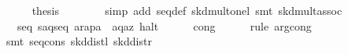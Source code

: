 \begin{isabellebody}
\ \ \ \ \isamarkupfalse%
\ {}thesis\isanewline
\ \ \ \ \ \ \isamarkupfalse%
\ {}simp\ add{}\ seq{}def\ skd{}mult{}onel{}\ {}smt\ skd{}mult{}assoc{}\isanewline
\ \ \isamarkupfalse%
\isanewline
\isanewline
\ \ \isamarkupfalse%
\ \isamarkupfalse%
\ {}{}{}{}\ {}\ seq\ {}s{}{}a{}{}q{}{}{}{}{}seq\ {}{}a{}{}r{}{}{}a{}{}p{}{}{}{}a{}\ {}\ {}a{}{}{}q{}{}{}{}{}a{}{}z{}{}\ halt{}{}\isanewline
\ \ \ \ \isamarkupfalse%
\ cong\isanewline
\ \ \ \ \isamarkupfalse%
\ {}rule\ arg{}cong{}\ \isamarkupfalse%
\ \isamarkupfalse%
\ \isamarkupfalse%
\isanewline
\ \ \ \ \isamarkupfalse%
\ {}smt\ seq{}cons\ skd{}distl\ skd{}distr{}\isanewline

\end{isabellebody}
